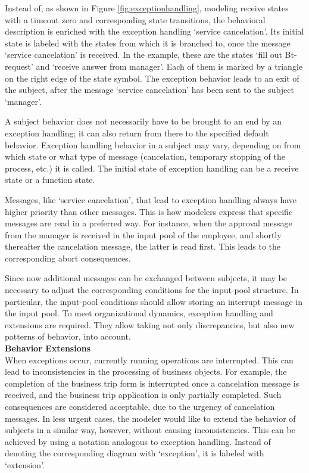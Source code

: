 Instead of, as shown in Figure \ref{fig:exceptionhandling}, modeling receive states with a timeout zero and corresponding state transitions, the behavioral description is enriched with the exception handling ‘service cancelation’. Its initial state is labeled with the states from which it is branched to, once the message ‘service cancelation’ is received. In the example, these are the states ‘fill out Bt-request’ and ‘receive answer from manager’. Each of them is marked by a triangle on the right edge of the state symbol. The exception behavior leads to an exit of the subject, after the message ‘service cancelation’ has been sent to the subject ‘manager’.

A subject behavior does not necessarily have to be brought to an end by an exception handling; it can also return from there to the specified default behavior. Exception handling behavior in a subject may vary, depending on from which state or what type of message (cancelation, temporary stopping of the process, etc.) it is called. The initial state of exception handling can be a receive state or a function state.

Messages, like ‘service cancelation’, that lead to exception handling always have higher priority than other messages. This is how modelers express that specific messages are read in a preferred way. For instance, when the approval message from the manager is received in the input pool of the employee, and shortly thereafter the cancelation message, the latter is read first. This leads to the corresponding abort consequences.

Since now additional messages can be exchanged between subjects, it may be necessary to adjust the corresponding conditions for the input-pool structure. In particular, the input-pool conditions should allow storing an interrupt message in the input pool.
To meet organizational dynamics, exception handling and extensions are required. They allow taking not only discrepancies, but also new patterns of behavior, into account.\\

\textbf{Behavior Extensions}\\
When exceptions occur, currently running operations are interrupted. This can lead to inconsistencies in the processing of business objects. For example, the completion of the business trip form is interrupted once a cancelation message is received, and the business trip application is only partially completed. Such consequences are considered acceptable, due to the urgency of cancelation messages. In less urgent cases, the modeler would like to extend the behavior of subjects in a similar way, however, without causing inconsistencies. This can be achieved by using a notation analogous to exception handling. Instead of denoting the corresponding diagram with ‘exception’, it is labeled with ‘extension’.

